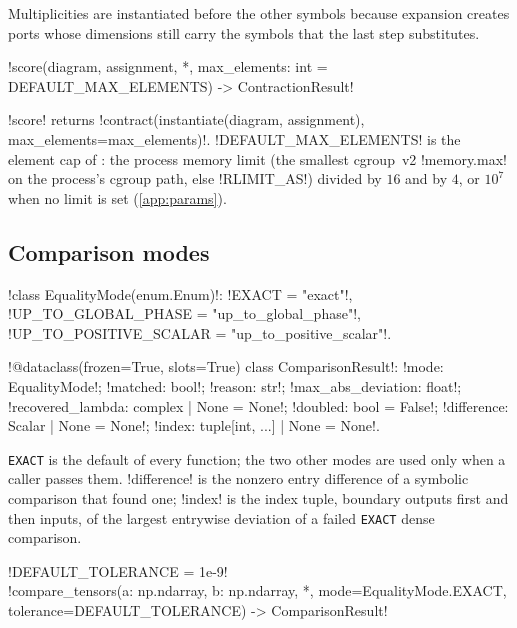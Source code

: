 Multiplicities are instantiated before the other symbols because expansion creates ports whose dimensions still carry the symbols that the last step substitutes.

\begin{signature}
\py!score(diagram, assignment, *, max_elements: int = DEFAULT_MAX_ELEMENTS) -> ContractionResult!
\end{signature}
\py!score! returns \py!contract(instantiate(diagram, assignment), max_elements=max_elements)!. \py!DEFAULT_MAX_ELEMENTS! is the element cap of : the process memory limit (the smallest cgroup~v2 \code!memory.max! on the process's cgroup path, else \code!RLIMIT_AS!) divided by $16$ and by $4$, or $10^7$ when no limit is set (\cref{app:params}).

\subsection{Comparison modes}

\begin{signature}
\py!class EqualityMode(enum.Enum)!: \py!EXACT = "exact"!, \py!UP_TO_GLOBAL_PHASE = "up_to_global_phase"!, \py!UP_TO_POSITIVE_SCALAR = "up_to_positive_scalar"!.

\py!@dataclass(frozen=True, slots=True) class ComparisonResult!: \py!mode: EqualityMode!; \py!matched: bool!; \py!reason: str!; \py!max_abs_deviation: float!; \py!recovered_lambda: complex | None = None!; \py!doubled: bool = False!; \py!difference: Scalar | None = None!; \py!index: tuple[int, ...] | None = None!.
\end{signature}

\texttt{EXACT} is the default of every function; the two other modes are used only when a caller passes them. \py!difference! is the nonzero entry difference of a symbolic comparison that found one; \py!index! is the index tuple, boundary outputs first and then inputs, of the largest entrywise deviation of a failed \texttt{EXACT} dense comparison.

\begin{signature}
\py!DEFAULT_TOLERANCE = 1e-9!\\
\py!compare_tensors(a: np.ndarray, b: np.ndarray, *, mode=EqualityMode.EXACT, tolerance=DEFAULT_TOLERANCE) -> ComparisonResult!
\end{signature}

